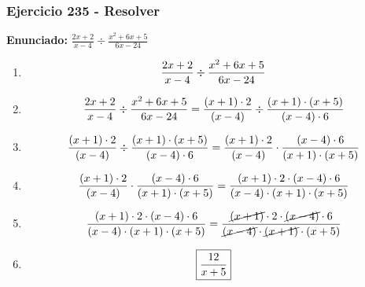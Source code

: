 \documentclass[11pt,a4paper]{article}
\newcommand{\fitmath}[1]{%
\[
\setbox0=\hbox{$\displaystyle #1$}%
\ifdim\wd0>\linewidth
\resizebox{\linewidth}{!}{$\displaystyle #1$}%
\else
#1%
\fi
\]
}
\begin{document}
\subsubsection*{Ejercicio 235 - Resolver}
\textbf{Enunciado:} $ \frac{2 x + 2}{x - 4} \div \frac{x^{2} + 6 x + 5}{6 x - 24} $\par
\begin{enumerate}[leftmargin=2em]
\item \fitmath{\frac{2 x + 2}{x - 4} \div \frac{x^{2} + 6 x + 5}{6 x - 24}}
\item \fitmath{\frac{2 x + 2}{x - 4} \div \frac{x^{2} + 6 x + 5}{6 x - 24}= \frac{\left(x + 1\right)\cdot 2}{\left(x - 4\right)} \div \frac{\left(x + 1\right)\cdot \left(x + 5\right)}{\left(x - 4\right)\cdot 6}}
\item \fitmath{\frac{\left(x + 1\right)\cdot 2}{\left(x - 4\right)}\div \frac{\left(x + 1\right)\cdot \left(x + 5\right)}{\left(x - 4\right)\cdot 6}= \frac{\left(x + 1\right)\cdot 2}{\left(x - 4\right)}\cdot \frac{\left(x - 4\right)\cdot 6}{\left(x + 1\right)\cdot \left(x + 5\right)}}
\item \fitmath{\frac{\left(x + 1\right)\cdot 2}{\left(x - 4\right)}\cdot \frac{\left(x - 4\right)\cdot 6}{\left(x + 1\right)\cdot \left(x + 5\right)}= \frac{\left(x + 1\right)\cdot 2\cdot \left(x - 4\right)\cdot 6}{\left(x - 4\right)\cdot \left(x + 1\right)\cdot \left(x + 5\right)}}
\item \fitmath{\frac{\left(x + 1\right)\cdot 2\cdot \left(x - 4\right)\cdot 6}{\left(x - 4\right)\cdot \left(x + 1\right)\cdot \left(x + 5\right)}= \frac{\cancel{\left(x + 1\right)}\cdot 2\cdot \cancel{\left(x - 4\right)}\cdot 6}{\cancel{\left(x - 4\right)}\cdot \cancel{\left(x + 1\right)}\cdot \left(x + 5\right)}}
\item \fitmath{\boxed{\frac{12}{x + 5}}}
\end{enumerate}

\vspace{0.12cm}
\end{document}
